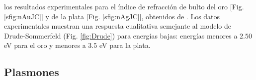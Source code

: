 los resultados experimentales para el índice de refracción de bulto del oro [Fig.  \ref{sfig:nAuJC}] y de la plata [Fig.  \ref{sfig:nAgJC}], obtenidos de  \cite{johnson1972constants}.  Los datos experimentales muestran una respuesta cualitativa semejante al modelo de Drude-Sommerfeld (Fig.  \ref{fig:Drude}) para energías bajas: energías menores a $2. 50$ eV para el oro y menores a $3. 5$ eV para la plata. %




\subsection{Plasmones}


